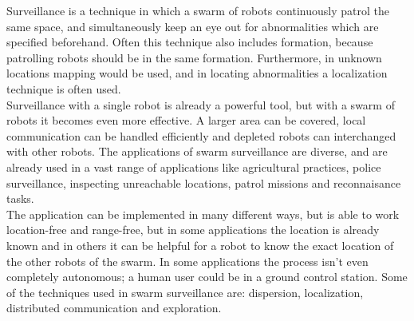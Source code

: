 
Surveillance is a technique in which a swarm of robots continuously patrol the same space, and simultaneously keep an eye out for abnormalities which are specified beforehand. Often this technique also includes formation, because patrolling robots should be in the same formation. Furthermore, in unknown locations mapping would be used, and in locating abnormalities a localization technique is often used. \\
Surveillance with a single robot is already a powerful tool, but with a swarm of robots it becomes even more effective. A larger area can be covered, local communication can be handled efficiently and depleted robots can interchanged with other robots. The applications of swarm surveillance are diverse, and are already used in a vast range of applications like agricultural practices, police surveillance, inspecting unreachable locations, patrol missions and reconnaisance tasks. \cite{Burkle2010} \\
The application can be implemented in many different ways, but is able to work location-free and range-free, but in some applications the location is already known and in others it can be helpful for a robot to know the exact location of the other robots of the swarm. In some applications the process isn't even completely autonomous; a human user could be in a ground control station. Some of the techniques used in swarm surveillance are: dispersion, localization, distributed communication and exploration. 